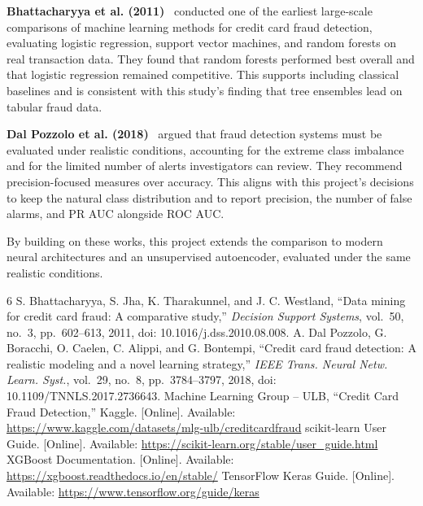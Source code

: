 \documentclass[journal]{IEEEtran}
\begin{document}
\textbf{Bhattacharyya et al. (2011)}~\cite{bhattacharyya} conducted one of the earliest large-scale comparisons of machine learning methods for credit card fraud detection, evaluating logistic regression, support vector machines, and random forests on real transaction data. They found that random forests performed best overall and that logistic regression remained competitive. This supports including classical baselines and is consistent with this study's finding that tree ensembles lead on tabular fraud data.

\textbf{Dal Pozzolo et al. (2018)}~\cite{dalpozzolo} argued that fraud detection systems must be evaluated under realistic conditions, accounting for the extreme class imbalance and for the limited number of alerts investigators can review. They recommend precision-focused measures over accuracy. This aligns with this project's decisions to keep the natural class distribution and to report precision, the number of false alarms, and PR AUC alongside ROC AUC.

By building on these works, this project extends the comparison to modern neural architectures and an unsupervised autoencoder, evaluated under the same realistic conditions.

\begin{thebibliography}{6}
 S. Bhattacharyya, S. Jha, K. Tharakunnel, and J. C. Westland, ``Data mining for credit card fraud: A comparative study,'' \emph{Decision Support Systems}, vol.~50, no.~3, pp.~602--613, 2011, doi: 10.1016/j.dss.2010.08.008.
 A. Dal Pozzolo, G. Boracchi, O. Caelen, C. Alippi, and G. Bontempi, ``Credit card fraud detection: A realistic modeling and a novel learning strategy,'' \emph{IEEE Trans. Neural Netw. Learn. Syst.}, vol.~29, no.~8, pp.~3784--3797, 2018, doi: 10.1109/TNNLS.2017.2736643.
 Machine Learning Group -- ULB, ``Credit Card Fraud Detection,'' Kaggle. [Online]. Available: \url{https://www.kaggle.com/datasets/mlg-ulb/creditcardfraud}
 scikit-learn User Guide. [Online]. Available: \url{https://scikit-learn.org/stable/user_guide.html}
 XGBoost Documentation. [Online]. Available: \url{https://xgboost.readthedocs.io/en/stable/}
 TensorFlow Keras Guide. [Online]. Available: \url{https://www.tensorflow.org/guide/keras}
\end{thebibliography}
\end{document}
